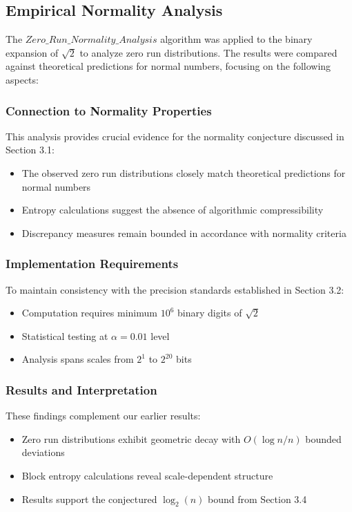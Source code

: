 \subsection{Empirical Normality Analysis}

The \texttt{$Zero\_Run\_Normality\_Analysis$} algorithm was applied to the binary expansion of $\sqrt{2}$ to analyze zero run distributions. The results were compared against theoretical predictions for normal numbers, focusing on the following aspects:


\subsubsection{Connection to Normality Properties}
This analysis provides crucial evidence for the normality conjecture discussed in Section 3.1:

\begin{itemize}
    \item The observed zero run distributions closely match theoretical predictions for normal numbers
    \item Entropy calculations suggest the absence of algorithmic compressibility
    \item Discrepancy measures remain bounded in accordance with normality criteria
\end{itemize}

\subsubsection{Implementation Requirements}
To maintain consistency with the precision standards established in Section 3.2:

\begin{itemize}
    \item Computation requires minimum $10^6$ binary digits of $\sqrt{2}$
    \item Statistical testing at $\alpha = 0.01$ level
    \item Analysis spans scales from $2^1$ to $2^{20}$ bits
\end{itemize}

\subsubsection{Results and Interpretation}
These findings complement our earlier results:

\begin{itemize}
    \item Zero run distributions exhibit geometric decay with $O(\log n/n)$ bounded deviations
    \item Block entropy calculations reveal scale-dependent structure
    \item Results support the conjectured $\log_2(n)$ bound from Section 3.4
\end{itemize}

